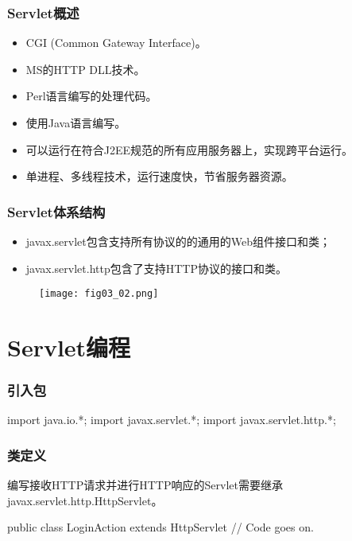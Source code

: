 \begin{frame}
\frametitle{Servlet概述}
\begin{itemize}
\item CGI (Common Gateway Interface)。
\item MS的HTTP DLL技术。
\item Perl语言编写的处理代码。
\end{itemize}

\begin{itemize}
\item 使用Java语言编写。
\item 可以运行在符合J2EE规范的所有应用服务器上，实现跨平台运行。
\item 单进程、多线程技术，运行速度快，节省服务器资源。
\end{itemize}
\end{frame}

\begin{frame}
\frametitle{Servlet体系结构} 
\begin{itemize}
\item javax.servlet包含支持所有协议的的通用的Web组件接口和类；
\item javax.servlet.http包含了支持HTTP协议的接口和类。
\end{itemize}
\begin{figure}
\centering
\texttt{[image: fig03\_02.png]}
\end{figure}
\end{frame}

\section{Servlet编程}

\begin{frame}[fragile] %
\frametitle{引入包} 
\begin{javaCode}
import java.io.*;
import javax.servlet.*;
import javax.servlet.http.*;
\end{javaCode}
\end{frame}

\begin{frame}[fragile] %
\frametitle{类定义} 

编写接收HTTP请求并进行HTTP响应的Servlet需要继承javax.servlet.http.HttpServlet。

\begin{javaCode}
public class LoginAction extends HttpServlet {
  // Code goes on.
}
\end{javaCode}
\end{frame}

